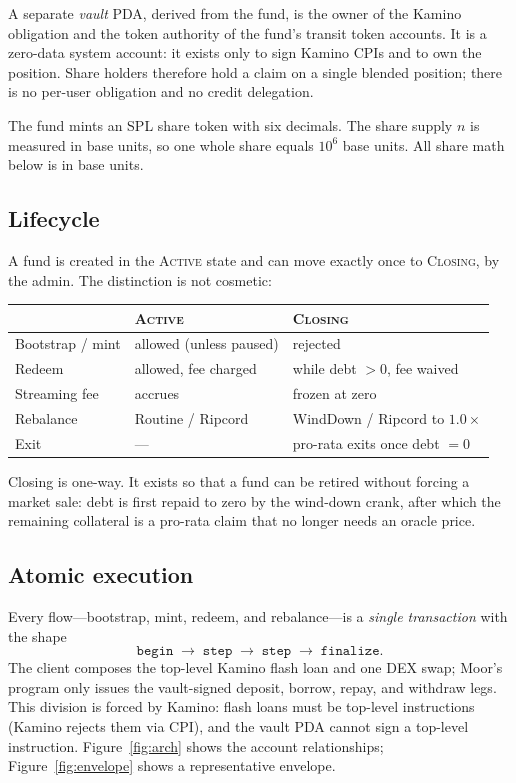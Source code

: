 \documentclass[11pt]{article}
\theoremstyle{remark}
\begin{document}
A separate \emph{vault} PDA, derived from the fund, is the owner of the Kamino obligation and the token authority of the fund's transit token accounts. It is a zero-data system account: it exists only to sign Kamino CPIs and to own the position. Share holders therefore hold a claim on a single blended position; there is no per-user obligation and no credit delegation.

The fund mints an SPL share token with six decimals. The share supply $n$ is measured in base units, so one whole share equals $10^{6}$ base units. All share math below is in base units.

\subsection{Lifecycle}

A fund is created in the \textsc{Active} state and can move exactly once to \textsc{Closing}, by the admin. The distinction is not cosmetic:

\begin{center}
\small
\begin{tabular}{@{}lll@{}}
\toprule
 & \textsc{Active} & \textsc{Closing} \\
\midrule
Bootstrap / mint & allowed (unless paused) & rejected \\
Redeem & allowed, fee charged & while debt $>0$, fee waived \\
Streaming fee & accrues & frozen at zero \\
Rebalance & Routine / Ripcord & WindDown / Ripcord to $1.0\times$ \\
Exit & --- & pro-rata exits once debt $=0$ \\
\bottomrule
\end{tabular}
\end{center}

Closing is one-way. It exists so that a fund can be retired without forcing a market sale: debt is first repaid to zero by the wind-down crank, after which the remaining collateral is a pro-rata claim that no longer needs an oracle price.

\subsection{Atomic execution}
\label{sec:envelope}

Every flow---bootstrap, mint, redeem, and rebalance---is a \emph{single transaction} with the shape
\[
\texttt{begin} \;\rightarrow\; \texttt{step} \;\rightarrow\; \texttt{step} \;\rightarrow\; \texttt{finalize}.
\]
The client composes the top-level Kamino flash loan and one DEX swap; Moor's program only issues the vault-signed deposit, borrow, repay, and withdraw legs. This division is forced by Kamino: flash loans must be top-level instructions (Kamino rejects them via CPI), and the vault PDA cannot sign a top-level instruction. Figure~\ref{fig:arch} shows the account relationships; Figure~\ref{fig:envelope} shows a representative envelope.
\end{document}
